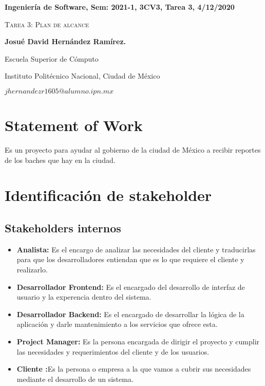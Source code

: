\documentclass[12pt,twoside]{article}
\date{}
\begin{document}
\centerline{\bf Ingeniería de Software, Sem: 2021-1, 3CV3, Tarea 3, 4/12/2020}
\centerline{}
\centerline{}
\begin{center}
\Large{\textsc{Tarea 3: Plan de alcance}}
\end{center}
\centerline{}
\centerline{\bf {Josu\'e David Hern\'andez Ram\'irez.}}
\centerline{}
\centerline{Escuela Superior de C\'omputo}
\centerline{Instituto Polit\'ecnico Nacional, Ciudad de M\'exico}
\centerline{$jhernandezr1605@alumno.ipn.mx$}
\newtheorem{Theorem}{\quad Theorem}[section]
\newtheorem{Definition}[Theorem]{\quad Definition}
\newtheorem{Corollary}[Theorem]{\quad Corollary}
\newtheorem{Lemma}[Theorem]{\quad Lemma}
\newtheorem{Example}[Theorem]{\quad Example}
\bigskip

\section{Statement of Work}
Es un proyecto para ayudar al gobierno de la ciudad de México a recibir reportes de los
baches que hay en la ciudad.

\section{Identificación de stakeholder}
\subsection{Stakeholders internos}
\begin{itemize}
    \item \textbf{Analista: }Es el encargo de analizar las necesidades del cliente
        y traducirlas para que los desarrolladores entiendan que es lo que
        requiere el cliente y realizarlo.
    \item \textbf{Desarrollador Frontend: }Es el encargado del desarrollo de
        interfaz de usuario y la experencia dentro del sistema.
    \item \textbf{Desarrollador Backend: }Es el encargado de desarrollar
        la lógica de la aplicación y darle mantenimiento a los servicios que
        ofrece esta.
    \item \textbf{Project Manager: }Es la persona encargada de dirigir el proyecto
        y cumplir las necesidades y requerimientos del cliente y de los usuarios.
    \item \textbf{Cliente :}Es la persona o empresa a la que vamos a cubrir sus 
        necesidades mediante el desarrollo de un sistema.
\end{itemize}
\end{document}
